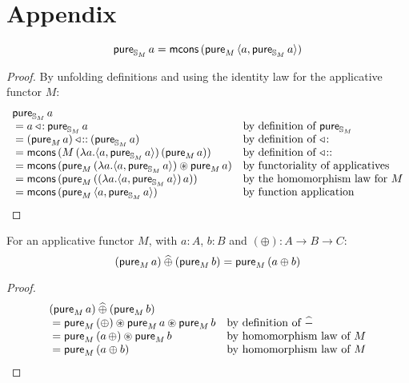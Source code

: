 
\section{Appendix}

\begin{lemmaa}{5}\label{lemma:monster_pure}
$$
\mathsf{pure}_{\mathbb{S}_{M}}\,a = \mathsf{mcons}\,(\mathsf{pure}_M\,\langle a, \mathsf{pure}_{\mathbb{S}_{M}}\,a\rangle)
$$
\end{lemmaa}
\begin{proof}
By unfolding definitions and using the identity law for the applicative functor $M$:
$$
\begin{array}{ll}
\mathsf{pure}_{\mathbb{S}_{M}}\,a \\
{}= a \mathbin{\triangleleft\!:} \mathsf{pure}_{\mathbb{S}_{M}}\,a
  & \mbox{by definition of }\mathsf{pure}_{\mathbb{S}_{M}} \\
{}= (\mathsf{pure}_M\,a) \mathbin{\triangleleft\!::} (\mathsf{pure}_{\mathbb{S}_{M}}\,a)
  & \mbox{by definition of }\mathbin{\triangleleft\!:}\\
{}=  \mathsf{mcons}\, (M\,(\lambda a. \langle a, \mathsf{pure}_{\mathbb{S}_{M}}\,a\rangle)\,(\mathsf{pure}_M\,a))
  & \mbox{by definition of }\mathbin{\triangleleft\!::}\\
{}= \mathsf{mcons}\, (\mathsf{pure}_M\,(\lambda a. \langle a, \mathsf{pure}_{\mathbb{S}_{M}}\,a\rangle) \circledast \mathsf{pure}_M\,a)
  & \mbox{by functoriality of applicatives}\\
{}= \mathsf{mcons}\, (\mathsf{pure}_M\,((\lambda a. \langle a, \mathsf{pure}_{\mathbb{S}_{M}}\,a\rangle)\,a))
  & \mbox{by the homomorphism law for }M\\
{}= \mathsf{mcons}\, (\mathsf{pure}_M\,\langle a, \mathsf{pure}_{\mathbb{S}_{M}}\,a\rangle)
  & \mbox{by function application}
\end{array}
$$
\end{proof}


\begin{lemmaa}{10}\label{lemma:pure_lift}
For an applicative functor $M$, with $a:A$, $b:B$ and $(\oplus) : A \rightarrow B \rightarrow C$:
$$
(\mathsf{pure}_M\, a) \mathbin{\widehat{\oplus}} (\mathsf{pure}_M\, b) = \mathsf{pure}_M\, (a \oplus b)
$$
\end{lemmaa}
\begin{proof}
$$
\begin{array}{ll}
(\mathsf{pure}_M\, a) \mathbin{\widehat{\oplus}} (\mathsf{pure}_M\, b) \\
{}= \mathsf{pure}_M\, (\oplus) \circledast \mathsf{pure}_M\, a \circledast \mathsf{pure}_M\, b
  & \mbox{by definition of }\mathbin{\widehat{-}}\\
{}= \mathsf{pure}_M\, (a\, \oplus) \circledast \mathsf{pure}_M\, b
  & \mbox{by homomorphism law of }M\\
{}= \mathsf{pure}_M\, (a \oplus b)
  & \mbox{by homomorphism law of }M\\
\end{array}
$$
\end{proof}

